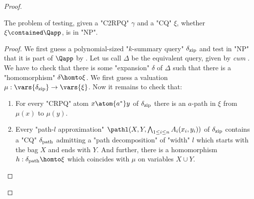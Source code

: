 \begin{proof}
  \begin{claim}\AP\label{claim:cq-in-Qapp-np}
    The problem of testing, given a "C2RPQ" $\gamma$ and a "CQ" $\xi$, whether $\xi \contained \Qapp$, is in "NP".
  \end{claim}
  \begin{proof}
        We first guess a polynomial-sized "$k$-summary query" $\delta_{\textup{zip}}$ and test in "NP" that it is part of $\Qapp$ by . 
        Let us call $\Delta$ be the equivalent {\UCRPQSRE} query, given by  \textit{cum} .
        We have to check that there is some "expansion" $\delta$ of $\Delta$ such that there is a "homomorphism" $\delta \homto \xi$. 
        We first guess a valuation $\mu :  \vars{\delta_{\textup{zip}}} \to \vars{\xi}$.
        Now it remains to check that:
        \begin{enumerate}
          \item For every "CRPQ" atom $x \atom{a^*} y$ of $\delta_{\textup{zip}}$ there is an $a$-path in $\xi$ from $\mu(x)$ to $\mu(y)$.
          \item Every "path-$l$ approximation" $\pathl(X, Y, \bigwedge_{1 \leq i \leq n} A_i(x_i,y_i))$ of $\delta_{\textup{zip}}$ contains a "CQ" $\delta_{\textup{path}}$  admitting a "path decomposition" of "width" $l$ which starts with the bag $X$ and ends with $Y$. And further, there is a homomorphism $h: \delta_{\textup{path}}  \homto \xi$ which coincides with $\mu$ on variables $X \cup Y$.

\end{enumerate}
\end{proof}
\end{proof}

